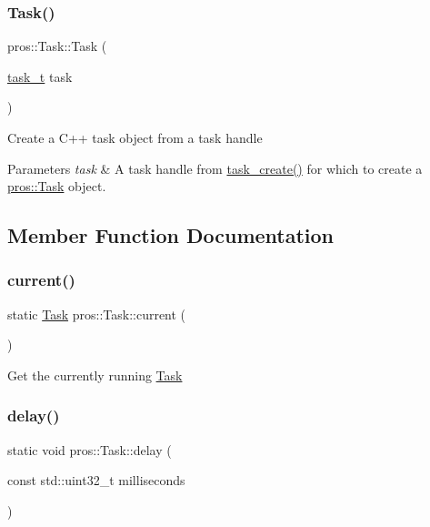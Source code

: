\subsubsection{\texorpdfstring{Task()}{Task()}\hspace{0.1cm}{\footnotesize\ttfamily [5/5]}}
{\footnotesize\ttfamily pros\+::\+Task\+::\+Task (\begin{DoxyParamCaption}\item[{\hyperlink{rtos_8h_a1d7e0825b8d8876e8cd8ece3f9115293}{task\+\_\+t}}]{task }\end{DoxyParamCaption})}

Create a C++ task object from a task handle


\begin{DoxyParams}{Parameters}
{\em task} & A task handle from \hyperlink{rtos_8h_a2e3ed8f26b8c1edcff493bc583f0a76a}{task\+\_\+create()} for which to create a \hyperlink{classpros_1_1Task}{pros\+::\+Task} object. \\
\hline
\end{DoxyParams}


\subsection{Member Function Documentation}
\mbox{\label{classpros_1_1Task_a510ca3e67e54aa4293438d73148a1d6b}} 
\subsubsection{\texorpdfstring{current()}{current()}}
{\footnotesize\ttfamily static \hyperlink{classpros_1_1Task}{Task} pros\+::\+Task\+::current (\begin{DoxyParamCaption}{ }\end{DoxyParamCaption})\hspace{0.3cm}{\ttfamily [static]}}

Get the currently running \hyperlink{classpros_1_1Task}{Task} \mbox{\label{classpros_1_1Task_a4341b580544831eea11b840cf068587b}} 
\subsubsection{\texorpdfstring{delay()}{delay()}}
{\footnotesize\ttfamily static void pros\+::\+Task\+::delay (\begin{DoxyParamCaption}\item[{const std\+::uint32\+\_\+t}]{milliseconds }\end{DoxyParamCaption})\hspace{0.3cm}{\ttfamily [static]}}

